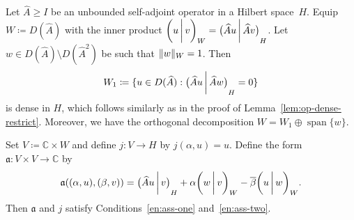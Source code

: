 \documentclass[a4paper,oneside,12pt]{amsart}
\theoremstyle{plain}
\theoremstyle{definition}
\newenvironment{example}
{\pushQED{\qed}

\examplex}
{\popQED\endexamplex}
\let\ge=\geqslant
\DeclarePairedDelimiter\norm{\lVert}{\rVert}
\begin{document}
\begin{example}
Let $\widehat{A}\ge I$ be an unbounded self-adjoint operator in a Hilbert space~$H$.
Equip $W\coloneqq D(\widehat{A})$ with the inner product ${{\ifthenelse{\equal{auto}{auto}}{\left({u}\mkern3mu{\biggm|}\mkern3mu {v}\right)}{}
\ifthenelse{\equal{auto}{b}}{\bigl({u}\mkern3mu{\biggm|}\mkern3mu {v}\bigr)}{}
\ifthenelse{\equal{auto}{B}}{\Bigl({u}\mkern3mu{\bigm|}\mkern3mu {v}\Bigr)}{}
}}_W={{\ifthenelse{\equal{b}{auto}}{\left({\widehat{A}u}\mkern3mu{\biggm|}\mkern3mu {\widehat{A}v}\right)}{}
\ifthenelse{\equal{b}{b}}{\bigl({\widehat{A}u}\mkern3mu{\biggm|}\mkern3mu {\widehat{A}v}\bigr)}{}
\ifthenelse{\equal{b}{B}}{\Bigl({\widehat{A}u}\mkern3mu{\bigm|}\mkern3mu {\widehat{A}v}\Bigr)}{}
}}_H$.
Let $w\in D(\widehat{A})\setminus D(\widehat{A}^2)$ be such that $\norm{w}_W=1$.
Then 
\[
    W_1\coloneqq\{u\in D(\widehat{A}): {{\ifthenelse{\equal{b}{auto}}{\left({\widehat{A} u}\mkern3mu{\biggm|}\mkern3mu {\widehat{A} w}\right)}{}
\ifthenelse{\equal{b}{b}}{\bigl({\widehat{A} u}\mkern3mu{\biggm|}\mkern3mu {\widehat{A} w}\bigr)}{}
\ifthenelse{\equal{b}{B}}{\Bigl({\widehat{A} u}\mkern3mu{\bigm|}\mkern3mu {\widehat{A} w}\Bigr)}{}
}}_H=0\}
\] 
is dense in $H$, which follows similarly as in the proof of Lemma~\ref{lem:op-dense-restrict}.
Moreover, we have the orthogonal decomposition $W=W_1\oplus\operatorname{span}\{w\}$.

Set $V\coloneqq {\mathbb{C}}\times W$ and define $j\colon V\to H$ by $j(\alpha,u)=u$.
Define the form ${{\mathfrak{{a}}}}\colon V\times V\to{\mathbb{C}}$ by
\[
    {{\mathfrak{{a}}}}((\alpha,u),(\beta,v)) = {{\ifthenelse{\equal{b}{auto}}{\left({\widehat{A} u}\mkern3mu{\biggm|}\mkern3mu {v}\right)}{}
\ifthenelse{\equal{b}{b}}{\bigl({\widehat{A} u}\mkern3mu{\biggm|}\mkern3mu {v}\bigr)}{}
\ifthenelse{\equal{b}{B}}{\Bigl({\widehat{A} u}\mkern3mu{\bigm|}\mkern3mu {v}\Bigr)}{}
}}_H + \alpha{{\ifthenelse{\equal{auto}{auto}}{\left({w}\mkern3mu{\biggm|}\mkern3mu {v}\right)}{}
\ifthenelse{\equal{auto}{b}}{\bigl({w}\mkern3mu{\biggm|}\mkern3mu {v}\bigr)}{}
\ifthenelse{\equal{auto}{B}}{\Bigl({w}\mkern3mu{\bigm|}\mkern3mu {v}\Bigr)}{}
}}_W - {\overline{{\beta}}}{{\ifthenelse{\equal{auto}{auto}}{\left({u}\mkern3mu{\biggm|}\mkern3mu {w}\right)}{}
\ifthenelse{\equal{auto}{b}}{\bigl({u}\mkern3mu{\biggm|}\mkern3mu {w}\bigr)}{}
\ifthenelse{\equal{auto}{B}}{\Bigl({u}\mkern3mu{\bigm|}\mkern3mu {w}\Bigr)}{}
}}_W.
\]
Then ${{\mathfrak{{a}}}}$ and $j$ satisfy Conditions~\ref{en:ass-one} and~\ref{en:ass-two}. 


\end{example}
\end{document}
